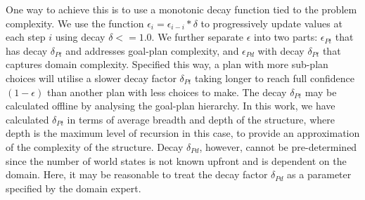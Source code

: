 %
%
%
%
%


%
One way to achieve this is to use a monotonic decay function tied to the problem complexity. We use the function $\epsilon_i = \epsilon_{i-i} * \delta$ to progressively update values at each step $i$ using decay $\delta <= 1.0$. We further separate $\epsilon$ into two parts: $\epsilon_{Pt}$ that has decay $\delta_{Pt}$ and addresses goal-plan complexity, and $\epsilon_{Pd}$ with decay $\delta_{Pt}$ that captures domain complexity.
%
Specified this way, a plan with more sub-plan choices will utilise a slower decay factor $\delta_{Pt}$ taking longer to reach full confidence $(1-\epsilon)$ than another plan with less choices to make. 
%
The decay $\delta_{Pt}$ may be calculated offline by analysing the goal-plan hierarchy. In this work, we have calculated $\delta_{Pt}$ in terms of average breadth and depth of the structure, where depth is the maximum level of recursion in this case, to provide an approximation of the complexity of the structure.
%
Decay $\delta_{Pd}$, however, cannot be pre-determined since the number of world states is not known upfront and is dependent on the domain. 
%
Here, it may be reasonable to treat the decay factor $\delta_{Pd}$ as a parameter specified by the domain expert.
